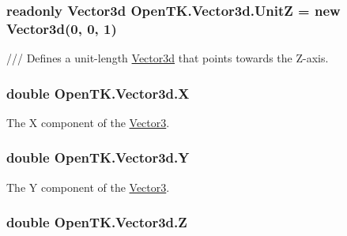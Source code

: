 \hypertarget{struct_open_t_k_1_1_vector3d_aa843d07a35e3d275f117d252877d2e55}{
\subsubsection[{Unit\-Z}]{\setlength{\rightskip}{0pt plus 5cm}readonly {\bf Vector3d} Open\-T\-K.\-Vector3d.\-Unit\-Z = new {\bf Vector3d}(0, 0, 1)\hspace{0.3cm}{\ttfamily [static]}}}\label{struct_open_t_k_1_1_vector3d_aa843d07a35e3d275f117d252877d2e55}


/// Defines a unit-\/length \hyperlink{struct_open_t_k_1_1_vector3d}{Vector3d} that points towards the Z-\/axis. 

\hypertarget{struct_open_t_k_1_1_vector3d_a1259c1afde67e1518d723d9e150c9c9e}{
\subsubsection[{X}]{\setlength{\rightskip}{0pt plus 5cm}double Open\-T\-K.\-Vector3d.\-X}}\label{struct_open_t_k_1_1_vector3d_a1259c1afde67e1518d723d9e150c9c9e}


The X component of the \hyperlink{struct_open_t_k_1_1_vector3}{Vector3}. 

\hypertarget{struct_open_t_k_1_1_vector3d_a8cb2eeeb8cf190e7aeab39af66a2ec5e}{
\subsubsection[{Y}]{\setlength{\rightskip}{0pt plus 5cm}double Open\-T\-K.\-Vector3d.\-Y}}\label{struct_open_t_k_1_1_vector3d_a8cb2eeeb8cf190e7aeab39af66a2ec5e}


The Y component of the \hyperlink{struct_open_t_k_1_1_vector3}{Vector3}. 

\hypertarget{struct_open_t_k_1_1_vector3d_a894d99bd161ab4ad52a45702f48641d5}{
\subsubsection[{Z}]{\setlength{\rightskip}{0pt plus 5cm}double Open\-T\-K.\-Vector3d.\-Z}}\label{struct_open_t_k_1_1_vector3d_a894d99bd161ab4ad52a45702f48641d5}


